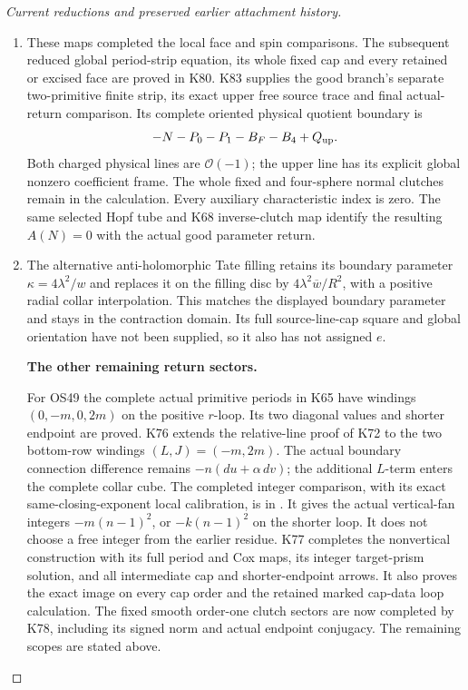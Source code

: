 \begin{proof}[Current reductions and preserved earlier attachment history]
\begin{enumerate}[label=\arabic*.]
\item These maps completed the local face and spin comparisons.
The subsequent reduced global period-strip equation, its whole
fixed cap and every retained or excised face are proved in K80.
K83 supplies the good branch's separate two-primitive finite
strip, its exact upper free source trace and final actual-return
comparison. Its complete oriented physical quotient boundary is
\[
              -N-P_0-P_1-B_F-B_4+Q_{\rm up}.
\]
Both charged physical lines are \(\mathcal O(-1)\); the upper
line has its explicit global nonzero coefficient frame. The whole
fixed and four-sphere normal clutches remain in the calculation.
Every auxiliary characteristic index is zero. The same selected
Hopf tube and K68 inverse-clutch map identify the resulting
\(A(N)=0\) with the actual good parameter return.

\item The alternative anti-holomorphic Tate filling retains its
boundary parameter \(\kappa=4\lambda^2/w\) and replaces
it on the filling disc by
\(4\lambda^2\overline w/R^2\), with a positive radial
collar interpolation. This matches the displayed boundary
parameter and stays in the contraction domain. Its full
source-line-cap square and global orientation have not
been supplied, so it also has not assigned \(e\).

\par\medskip\noindent\textbf{The other remaining return sectors.}\par\nopagebreak[4]
For OS49 the complete actual primitive periods in K65 have
windings \((0,-m,0,2m)\) on the positive \(r\)-loop.
Its two diagonal values and shorter endpoint are proved.
K76 extends the relative-line proof of K72 to the two
bottom-row windings \((L,J)=(-m,2m)\).
The actual boundary connection difference remains
\(-n(du+\alpha\,dv)\); the additional \(L\)-term enters
the complete collar cube. The completed integer comparison,
with its exact same-closing-exponent local calibration, is in
.
It gives the actual vertical-fan integers
\(-m(n-1)^2\), or \(-k(n-1)^2\) on the shorter loop.
It does not choose a free integer from the earlier residue.
K77 completes the nonvertical construction with its full
period and Cox maps, its integer target-prism solution,
and all intermediate cap and shorter-endpoint arrows.
It also proves the exact image on every cap order and
the retained marked cap-data loop calculation. The
fixed smooth order-one clutch sectors are now completed
by K78, including its signed norm and actual endpoint conjugacy.
The remaining scopes are stated above.


\end{enumerate}
\end{proof}
